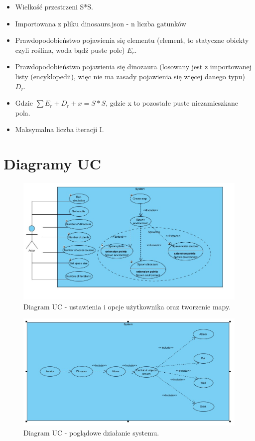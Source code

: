 \begin{itemize}
        \begin{itemize}
            \item Wielkość przestrzeni S*S.
            \item Importowana z pliku dinosaurs.json - n liczba gatunków
            \item Prawdopodobieństwo pojawienia się elementu (element, to statyczne obiekty czyli roślina, woda bądź puste pole) $E_r$.
            \item Prawdopodobieństwo pojawienia się dinozaura (losowany jest z importowanej listy (encyklopedii), więc nie ma zasady pojawienia się więcej danego typu) $D_r$.
            \item Gdzie $\sum E_r + D_r + x = S*S$, gdzie x to pozostałe puste niezamieszkane pola.
            \item Maksymalna liczba iteracji I.
        \end{itemize}
\end{itemize}
\newpage
\section{Diagramy UC}
    \begin{figure}[h!]
        \centering
        \includegraphics[scale=0.65]{images/usecase/use_case1.jpg}
        \caption{Diagram UC - ustawienia i opcje użytkownika oraz tworzenie mapy.}
        \label{fig:uc}
    \end{figure}
    
    \begin{figure}[h]
        \centering
        \includegraphics[scale=0.65]{images/usecase/use_case2.jpg}
        \caption{Diagram UC - poglądowe działanie systemu.}
        \label{fig:my_label}
    \end{figure}
\newpage 
